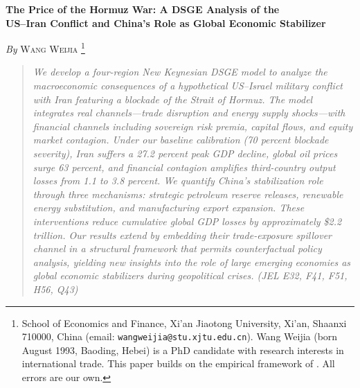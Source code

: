 \documentclass[12pt,a4paper]{article}
\begin{document}
\begin{center}
{\large\bfseries The Price of the Hormuz War: A DSGE Analysis of the\\[0.4em]
US--Iran Conflict and China's Role as Global Economic Stabilizer\par}
\vspace{0.9em}
{\normalsize \textit{By} \textsc{Wang Weijia}%
\footnote{School of Economics and Finance, Xi'an Jiaotong University,
Xi'an, Shaanxi 710000, China (email: \texttt{wangweijia@stu.xjtu.edu.cn}).
Wang Weijia (born August 1993, Baoding, Hebei) is a PhD candidate with
research interests in international trade.
This paper builds on the empirical framework of \citet{federle2026price}.
All errors are our own.}\par}
\end{center}
\vspace{0.9em}

\begin{quote}
\itshape
We develop a four-region New Keynesian DSGE model to analyze the
macroeconomic consequences of a hypothetical US--Israel military conflict
with Iran featuring a blockade of the Strait of Hormuz. The model integrates
real channels---trade disruption and energy supply shocks---with financial
channels including sovereign risk premia, capital flows, and equity market
contagion. Under our baseline calibration (70 percent blockade severity),
Iran suffers a 27.2 percent peak GDP decline, global oil prices surge
63 percent, and financial contagion amplifies third-country output losses
from 1.1 to 3.8 percent. We quantify China's stabilization role through
three mechanisms: strategic petroleum reserve releases, renewable energy
substitution, and manufacturing export expansion. These interventions
reduce cumulative global GDP losses by approximately \$2.2 trillion.
Our results extend \citet{federle2026price} by embedding their
trade-exposure spillover channel in a structural framework that permits
counterfactual policy analysis, yielding new insights into the role of
large emerging economies as global economic stabilizers during
geopolitical crises.
(\textit{JEL} E32, F41, F51, H56, Q43)
\end{quote}

\newpage
\setcounter{page}{1}

\end{document}
